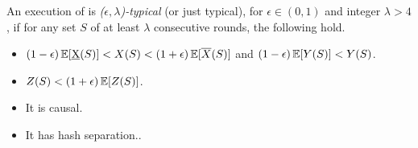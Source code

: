 \begin{definition}
  An execution of \poem is \emph{($\epsilon,\lambda$)-typical} (or just typical),
  for $\epsilon \in (0,1)$ and integer $\lambda > 4$, if for any set $S$ of at
  least $\lambda$ consecutive rounds, the following hold.
  \begin{itemize}
    \item $(1 - \epsilon) \mathop{{}\mathbb{E}}[\underbar{X}(S)] < X(S) < (1 + \epsilon) \mathop{{}\mathbb{E}}[\overline{X}(S)]$ and $(1-\epsilon) \mathop{{}\mathbb{E}}[Y(S)] < Y(S)$.\label{item:typicality-x-y}
    \item $Z(S) < (1 + \epsilon)\mathop{{}\mathbb{E}}[Z(S)]$.\label{item:typicality-z}
    \item It is causal.\label{item:typicality-causal}
    \item It has hash separation..\label{item:typicality-hash-separation}
  \end{itemize}
\end{definition}

